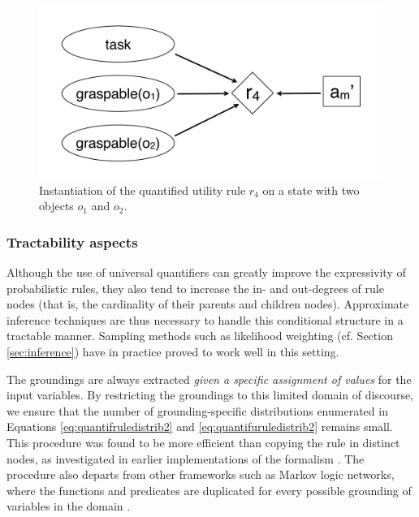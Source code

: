 \begin{figure}[ht]
\centering
\includegraphics[scale=0.25]{imgs/quantutilruleinstantiation.pdf}
\caption{Instantiation of the quantified utility rule $r_4$ on a state with two objects $o_1$ and $o_2$.}
\label{fig:quantinstantitionutil}
\end{figure}

\subsubsection*{Tractability aspects}

Although the use of universal quantifiers can greatly improve the expressivity of probabilistic rules, they also tend to increase the in- and out-degrees of rule nodes (that is, the cardinality of their parents and children nodes). Approximate inference techniques are thus necessary to handle this conditional structure in a tractable manner. Sampling methods such as likelihood weighting (cf. Section \ref{sec:inference}) have in practice proved to work well in this setting.

The groundings are always extracted \textit{given a specific assignment of values} for the input variables. By restricting the groundings to this limited domain of discourse, we ensure that the number of grounding-specific distributions enumerated in Equations \eqref{eq:quantifruledistrib2} and \eqref{eq:quantifuruledistrib2} remains small.   This procedure was found to be more efficient than copying the rule in distinct nodes, as investigated in earlier implementations of the formalism \citep{relational-apl2012}. The procedure also departs from other frameworks such as Markov logic networks, where the functions and predicates are duplicated for every possible grounding of variables in the domain \citep{Richardson:2006}.




